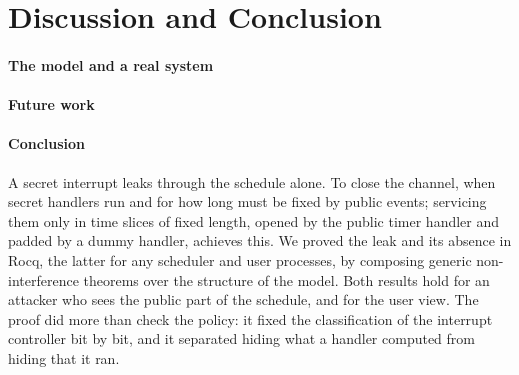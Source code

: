 \section{Discussion and Conclusion}\label{sec:conclusion}

\paragraph{The model and a real system} 

\paragraph{Future work} 

\paragraph{Conclusion} A secret interrupt leaks through the schedule alone. To close
the channel, when secret handlers run and for how long must be fixed by public events;
servicing them only in time slices of fixed length, opened by the public timer handler
and padded by a dummy handler, achieves this. We proved the leak and its absence in
Rocq, the latter for any scheduler and user processes, by composing
generic non-interference theorems over the structure of the model. Both results hold
for an attacker who sees the public part of the schedule, and for the
user view. The proof did more than check the policy: it fixed the classification of the
interrupt controller bit by bit, and it separated hiding what a handler computed from
hiding that it ran.
